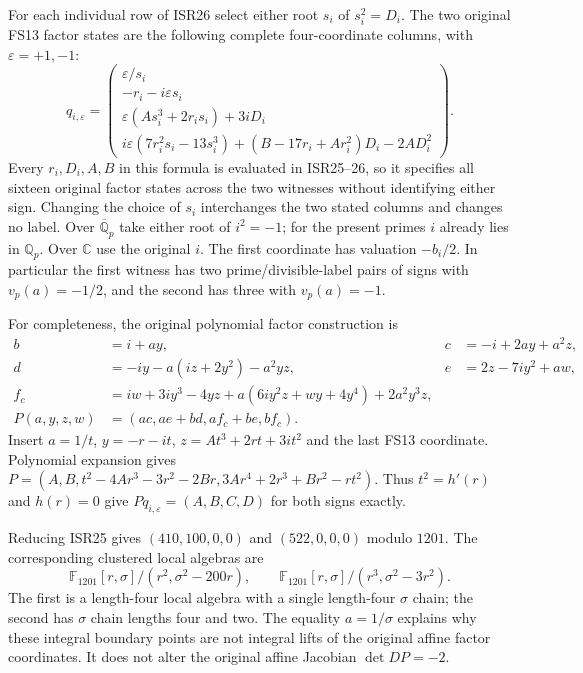 \documentclass[11pt]{article}
\begin{document}
For each individual row of ISR26 select either root
$s_i$ of $s_i^2=D_i$. The two original FS13 factor states are the
following complete four-coordinate columns, with $\varepsilon=+1,-1$:
\begin{equation}
 q_{i,\varepsilon}=\begin{pmatrix}
 \varepsilon/s_i\\
 -r_i-i\varepsilon s_i\\
 \varepsilon(As_i^3+2r_i s_i)+3iD_i\\
 i\varepsilon(7r_i^2s_i-13s_i^3)
          +(B-17r_i+Ar_i^2)D_i-2AD_i^2
 \end{pmatrix}.                                        \tag{ISR27}
\end{equation}
Every $r_i,D_i,A,B$ in this formula is evaluated in ISR25--26, so
it specifies all sixteen original factor states across the two
witnesses without identifying either sign. Changing the choice of
$s_i$ interchanges the two stated columns and changes no label.
Over $\overline{\mathbb Q}_p$ take either root of $i^2=-1$; for
the present primes $i$ already lies in $\mathbb Q_p$. Over $\mathbb C$
use the original $i$. The first coordinate has valuation $-b_i/2$.
In particular the first witness has two prime/divisible-label pairs
of signs with $v_p(a)=-1/2$, and the second has three with $v_p(a)=-1$.

For completeness, the original polynomial factor construction is
\begin{align*}
 b&=i+ay,&c&=-i+2ay+a^2z,\\
 d&=-iy-a(iz+2y^2)-a^2yz,&e&=2z-7iy^2+aw,\\
 f_c&=iw+3iy^3-4yz+a(6iy^2z+wy+4y^4)+2a^2y^3z,\\
 P(a,y,z,w)&=(ac,ae+bd,af_c+be,bf_c).
\end{align*}
Insert $a=1/t$, $y=-r-it$, $z=At^3+2rt+3it^2$ and the last
FS13 coordinate. Polynomial expansion gives
$P=(A,B,t^2-4Ar^3-3r^2-2Br,
3Ar^4+2r^3+Br^2-rt^2)$. Thus $t^2=h'(r)$ and $h(r)=0$
give $Pq_{i,\varepsilon}=(A,B,C,D)$ for both signs exactly.

Reducing ISR25 gives $(410,100,0,0)$ and $(522,0,0,0)$ modulo
$1201$. The corresponding clustered local algebras are
\begin{equation}
 \mathbb F_{1201}[r,\sigma]/(r^2,\sigma^2-200r),\qquad
 \mathbb F_{1201}[r,\sigma]/(r^3,\sigma^2-3r^2).          \tag{ISR28}
\end{equation}
The first is a length-four local algebra with a single length-four
$\sigma$ chain; the second has $\sigma$ chain lengths four and two.
The equality $a=1/\sigma$ explains why these integral boundary points
are not integral lifts of the original affine factor coordinates.
It does not alter the original affine Jacobian $\det DP=-2$.
\end{document}
